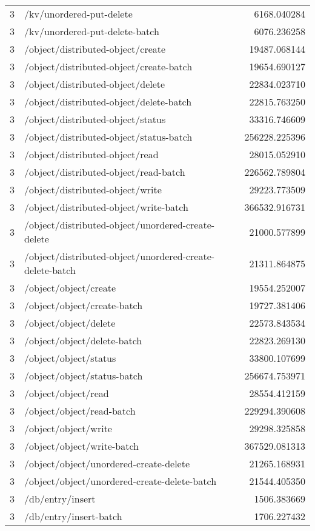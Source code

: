 \begin{longtable}{rlr}
3 & /kv/unordered-put-delete & 6168.040284 \\
3 & /kv/unordered-put-delete-batch & 6076.236258 \\
3 & /object/distributed-object/create & 19487.068144 \\
3 & /object/distributed-object/create-batch & 19654.690127 \\
3 & /object/distributed-object/delete & 22834.023710 \\
3 & /object/distributed-object/delete-batch & 22815.763250 \\
3 & /object/distributed-object/status & 33316.746609 \\
3 & /object/distributed-object/status-batch & 256228.225396 \\
3 & /object/distributed-object/read & 28015.052910 \\
3 & /object/distributed-object/read-batch & 226562.789804 \\
3 & /object/distributed-object/write & 29223.773509 \\
3 & /object/distributed-object/write-batch & 366532.916731 \\
3 & /object/distributed-object/unordered-create-delete & 21000.577899 \\
3 & /object/distributed-object/unordered-create-delete-batch & 21311.864875 \\
3 & /object/object/create & 19554.252007 \\
3 & /object/object/create-batch & 19727.381406 \\
3 & /object/object/delete & 22573.843534 \\
3 & /object/object/delete-batch & 22823.269130 \\
3 & /object/object/status & 33800.107699 \\
3 & /object/object/status-batch & 256674.753971 \\
3 & /object/object/read & 28554.412159 \\
3 & /object/object/read-batch & 229294.390608 \\
3 & /object/object/write & 29298.325858 \\
3 & /object/object/write-batch & 367529.081313 \\
3 & /object/object/unordered-create-delete & 21265.168931 \\
3 & /object/object/unordered-create-delete-batch & 21544.405350 \\
3 & /db/entry/insert & 1506.383669 \\
3 & /db/entry/insert-batch & 1706.227432 \\

\end{longtable}
